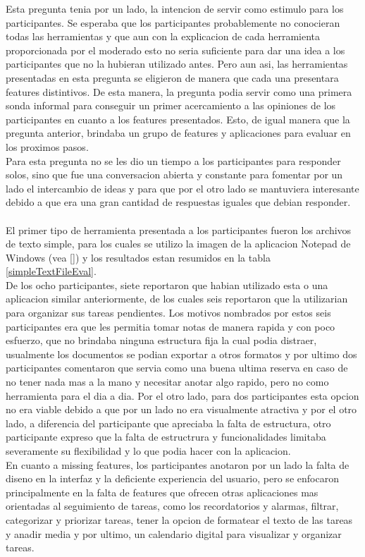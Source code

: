 Esta pregunta tenia por un lado, la intencion de servir como estimulo para los participantes. Se esperaba que los participantes probablemente no conocieran todas las herramientas y que aun con la explicacion de cada herramienta proporcionada por el moderado esto no seria suficiente para dar una idea a los participantes que no la hubieran utilizado antes. Pero aun asi, las herramientas presentadas en esta pregunta se eligieron de manera que cada una presentara features distintivos. De esta manera, la pregunta podia servir como una primera sonda informal para conseguir un primer acercamiento a las opiniones de los participantes en cuanto a los features presentados. Esto, de igual manera que la pregunta anterior, brindaba un grupo de features y aplicaciones para evaluar en los proximos pasos.\\
Para esta pregunta no se les dio un tiempo a los participantes para responder solos, sino que fue una conversacion abierta y constante para fomentar por un lado el intercambio de ideas y para que por el otro lado se mantuviera interesante debido a que era una gran cantidad de respuestas iguales que debian responder.\\
\\
El primer tipo de herramienta presentada a los participantes fueron los archivos de texto simple, para los cuales se utilizo la imagen de la aplicacion Notepad de Windows (vea \ref{}) y los resultados estan resumidos en la tabla \ref{simpleTextFileEval}.\\
De los ocho participantes, siete reportaron que habian utilizado esta o una aplicacion similar anteriormente, de los cuales seis reportaron que la utilizarian para organizar sus tareas pendientes. Los motivos nombrados por estos seis participantes era que les permitia tomar notas de manera rapida y con poco esfuerzo, que no brindaba ninguna estructura fija la cual podia distraer, usualmente los documentos se podian exportar a otros formatos y por ultimo dos participantes comentaron que servia como una buena ultima reserva en caso de no tener nada mas a la mano y necesitar anotar algo rapido, pero no como herramienta para el dia a dia. Por el otro lado, para dos participantes esta opcion no era viable debido a que por un lado no era visualmente atractiva y por el otro lado, a diferencia del participante que apreciaba la falta de estructura, otro participante expreso que la falta de estructrura y funcionalidades limitaba severamente su flexibilidad y lo que podia hacer con la aplicacion.\\
En cuanto a missing features, los participantes anotaron por un lado la falta de diseno en la interfaz y la deficiente experiencia del usuario, pero se enfocaron principalmente en la falta de features que ofrecen otras aplicaciones mas orientadas al seguimiento de tareas, como los recordatorios y alarmas, filtrar, categorizar y priorizar tareas, tener la opcion de formatear el texto de las tareas y anadir media y por ultimo, un calendario digital para visualizar y organizar tareas. \\
